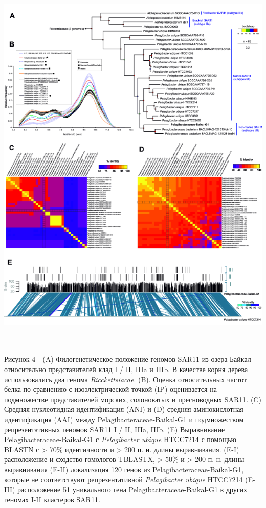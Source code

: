 \documentclass[a4paper,12pt,openany,final]{extreport}
\begin{document}
\includegraphics[width=5.92569in,height=7.3625in]{media/image9.png}

Рисунок 4 - (A) Филогенетическое положение геномов SAR11 из озера Байкал
относительно представителей клад I / II, IIIa и IIIb. В качестве корня
дерева использовались два генома \emph{Ricckettsiacae}. (B). Оценка
относительных частот белка по сравнению с изоэлектрической точкой (IP)
оценивается на подмножестве представителей морских, солоноватых и
пресноводных SAR11. (C) Средняя нуклеотидная идентификация (ANI) и (D)
средняя аминокислотная идентификация (AAI) между
Pelagibacteraceae-Baikal-G1 и подмножеством репрезентативных геномов
SAR11 I / II, IIIa, IIIb. (E) Выравнивание Pelagibacteraceae-Baikal-G1 с
\emph{Pelagibacter ubique} HTCC7214 с помощью BLASTN с \textgreater{}
70\% идентичности и \textgreater{} 200 п. н. длины выравнивания. (E-I)
расположение и сходство гомологов TBLASTX, \textgreater{} 50\% и
\textgreater{} 200 п. н. длины выравнивания (E-II) локализация 120 генов
из Pelagibacteraceae-Baikal-G1, которые не соответствуют
репрезентативной \emph{Pelagibacter ubique} HTCC7214 (E- III)
расположение 51 уникального гена Pelagibacteraceae-Baikal-G1 в других
геномах I-II кластеров SAR11.
\end{document}
